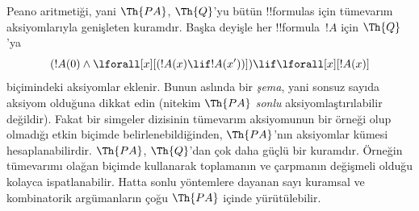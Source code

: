 \documentclass[../../../include/open-logic-section]{subfiles}
\begin{document}


Peano aritmetiği, yani $\Th{PA}$, $\Th{Q}$'yu bütün !!{formula}s için
tümevarım aksiyomlarıyla genişleten kuramdır. Başka deyişle her
!!{formula}~$!A$ için $\Th{Q}$'ya
\[
(!A(0) \land \lforall[x][(!A(x) \lif !A(x'))]) \lif \lforall[x][!A(x)]
\]
biçimindeki aksiyomlar eklenir. Bunun aslında bir \emph{şema}, yani sonsuz
sayıda aksiyom olduğuna dikkat edin (nitekim $\Th{PA}$ {\em sonlu}
aksiyomlaştırılabilir değildir). Fakat bir simgeler dizisinin tümevarım
aksiyomunun bir örneği olup olmadığı etkin biçimde belirlenebildiğinden,
$\Th{PA}$'nın aksiyomlar kümesi hesaplanabilirdir. $\Th{PA}$, $\Th{Q}$'dan
çok daha güçlü bir kuramdır. Örneğin tümevarımı olağan biçimde kullanarak
toplamanın ve çarpmanın değişmeli olduğu kolayca ispatlanabilir. Hatta sonlu
yöntemlere dayanan sayı kuramsal ve kombinatorik argümanların çoğu $\Th{PA}$
içinde yürütülebilir.
\end{document}
